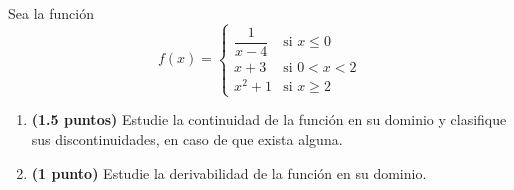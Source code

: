 
Sea la función
\[
f(x)=\begin{cases}
\dfrac{1}{x-4} & \text{si }x\leq 0\\[4pt]
x+3 & \text{si }0<x<2\\[4pt]
x^2+1 & \text{si }x\geq 2
\end{cases}
\]
\begin{enumerate}[label=\alph*)]
\item \textbf{(1.5 puntos)} Estudie la continuidad de la función en su dominio y clasifique sus discontinuidades, en caso de que exista alguna.
\item \textbf{(1 punto)} Estudie la derivabilidad de la función en su dominio.
\end{enumerate}
